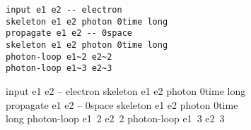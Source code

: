 \documentclass[12pt]{article}
\begin{document}
\begin{figure}[h!]\begin{subfigure}[h]{0.66\textwidth}\begin{center}
\begin{lstlisting}
input e1 e2 -- electron
skeleton e1 e2 photon 0time long
propagate e1 e2 -- 0space
skeleton e1 e2 photon 0time long
photon-loop e1~2 e2~2
photon-loop e1~3 e2~3
\end{lstlisting}
\end{center}\end{subfigure}\hfill\vrule\hfill\begin{subfigure}[h]{0.2\textwidth}\begin{center}
\begin{feynr}
input e1 e2 -- electron
skeleton e1 e2 photon 0time long
propagate e1 e2 -- 0space
skeleton e1 e2 photon 0time long
photon-loop e1~2 e2~2
photon-loop e1~3 e2~3
\end{feynr}
\end{center}\end{subfigure}\end{figure}

\newpage
\end{document}
